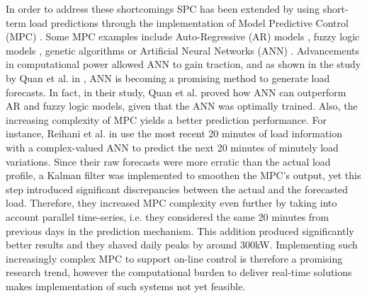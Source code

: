 In order to address these shortcomings SPC has been extended by using short-term load predictions through the implementation of Model Predictive Control (MPC) \cite{Gybel2012, Hatziargyriou2015}.
Some MPC examples include Auto-Regressive (AR) models \cite{Li2009, Nie2011}, fuzzy logic models \cite{Sannomiya2001, Chen2013a}, genetic algorithms \cite{Xia2015a, Liu2015} or Artificial Neural Networks (ANN) \cite{Kalogirou2014, Quan2014, Lee2014, Pezeshki2014, Vaz2016, Reihani2016, Xiao2017}.
Advancements in computational power allowed ANN to gain traction, and as shown in the study by Quan et al. in \cite{Quan2014}, ANN is becoming a promising method to generate load forecasts.
In fact, in their study, Quan et al. proved how ANN can outperform AR and fuzzy logic models, given that the ANN was optimally trained.
Also, the increasing complexity of MPC yields a better prediction performance.
For instance, Reihani et al. in \cite{Reihani2016} use the most recent 20 minutes of load information with a complex-valued ANN to predict the next 20 minutes of minutely load variations.
Since their raw forecasts were more erratic than the actual load profile, a Kalman filter was implemented to smoothen the MPC's output, yet this step introduced significant discrepancies between the actual and the forecasted load.
Therefore, they increased MPC complexity even further by taking into account parallel time-series, i.e. they considered the same 20 minutes from previous days in the prediction mechanism.
This addition produced significantly better results and they shaved daily peaks by around 300kW.
Implementing such increasingly complex MPC to support on-line control is therefore a promising research trend, however the computational burden to deliver real-time solutions makes implementation of such systems not yet feasible.

